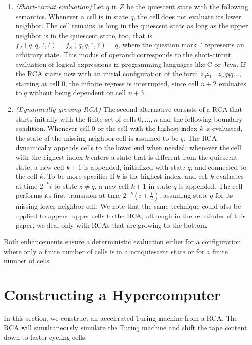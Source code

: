 \documentclass[pre,amssymb,showpacs,showkeys,preprint]{revtex4}
\begin{document}
\begin{enumerate}

\item \emph{(Short-circuit evaluation)}
Let $q$ in $Z$ be the quiescent state with the following semantics.
Whenever a cell is in state $q$, the cell does not evaluate its lower neighbor.
The cell remains as long in the quiescent state as long as the upper neighbor is in the quiescent state, too,
that is $f_A(q, q, ?, ?) = f_S(q, q, ?, ?) = q$, where the question mark $?$ represents an arbitrary state.
This modus of operandi corresponds to the short-circuit evaluation of logical expressions in programming
languages like C or Java.
If the RCA starts now with an initial configuration of the form $z_0 z_1 \ldots z_n q q q\ldots$, starting at cell $0$, the infinite
regress is interrupted, since cell $n+2$ evaluates to $q$ without being dependent on cell $n+3$.

\item \emph{(Dynamically growing RCA)}
The second alternative consists of a RCA that starts initially with the finite set of cells $0, \ldots, n$ and the following
boundary condition.
Whenever cell $0$ or the cell with the highest index $k$ is evaluated, the state of the missing neighbor cell is assumed to be $q$.
The RCA dynamically appends cells to the lower end when needed:
whenever the cell with the highest index $k$ enters a state that is different from the quiescent state,
a new cell $k + 1$ is appended, initialized with state $q$, and connected to the cell $k$.
To be more specific: If $k$ is the highest index, and cell $k$ evaluates at time $2^{-k} i$ to state $z \neq q$,
a new cell $k + 1$ in state $q$ is appended.
The cell performs its first transition at time $2^{-k} (i + \frac{1}{2})$, assuming state $q$ for its missing lower neighbor cell.
We note that the same technique could also be applied to append upper cells to the RCA, although in the remainder of this paper, we deal only
with RCAs that are growing to the bottom.

\end{enumerate}

Both enhancements ensure a deterministic evaluation either for a configuration where only a finite number of cells is in a nonquiescent state
or for a finite number of cells.

\section{Constructing a Hypercomputer}
\label{chap:hypercomputer}
In this section, we construct an accelerated Turing machine from a RCA.
The RCA will simultaneously simulate the Turing machine and shift the tape content down
to faster cycling cells.
\end{document}

